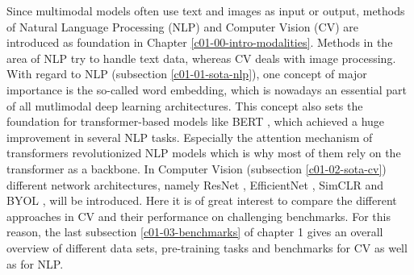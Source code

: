\documentclass[
]{krantz}
\begin{document}
Since multimodal models often use text and images as input or output, methods of Natural Language Processing (NLP) and Computer Vision (CV) are introduced as foundation in Chapter \ref{c01-00-intro-modalities}. Methods in the area of NLP try to handle text data, whereas CV deals with image processing. With regard to NLP (subsection \ref{c01-01-sota-nlp}), one concept of major importance is the so-called word embedding, which is nowadays an essential part of all mutlimodal deep learning architectures. This concept also sets the foundation for transformer-based models like BERT \citep{BERT}, which achieved a huge improvement in several NLP tasks. Especially the attention mechanism \citep{attention} of transformers revolutionized NLP models which is why most of them rely on the transformer as a backbone. In Computer Vision (subsection \ref{c01-02-sota-cv}) different network architectures, namely ResNet \citep{ResNet}, EfficientNet \citep{EfficientNet}, SimCLR \citep{SimCLR} and BYOL \citep{BYOL}, will be introduced. Here it is of great interest to compare the different approaches in CV and their performance on challenging benchmarks. For this reason, the last subsection \ref{c01-03-benchmarks} of chapter 1 gives an overall overview of different data sets, pre-training tasks and benchmarks for CV as well as for NLP.
\end{document}
